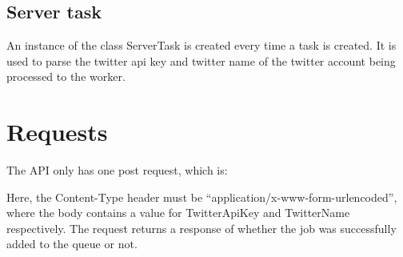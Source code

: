 \subsection{Server task}
An instance of the class ServerTask is created every time a task is created. It
is used to parse the twitter api key and twitter name of the twitter account
being processed to the worker.


\section{Requests}
The \ac{API} only has one post request, which is: \nl

\nl

Here, the Content-Type header must be ``application/x-www-form-urlencoded'',
where the body contains a value for TwitterApiKey and TwitterName
respectively.
The request returns a response of whether the job was successfully added to the
queue or not.



